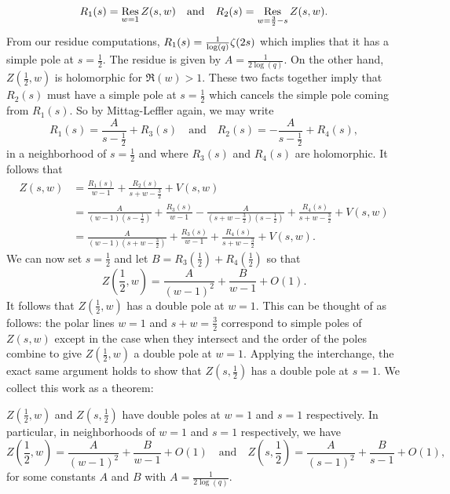 \documentclass[12pt,reqno,oneside]{amsart}
\begin{document}
    \[
        R_{1}(s) = \operatorname*{\mathrm{Res}}_{w = 1}Z(s,w) \quad \text{and} \quad R_{2}(s) = \operatorname*{\mathrm{Res}}_{w = \frac{3}{2}-s}Z(s,w).
    \]
    From our residue computations, $R_{1}(s) = \frac{1}{\log(q)}\zeta(2s)$ which implies that it has a simple pole at $s = \frac{1}{2}$. The residue is given by $A = \frac{1}{2\log(q)}$. On the other hand, $Z\left(\frac{1}{2},w\right)$ is holomorphic for $\Re(w) > 1$. These two facts together imply that $R_{2}(s)$ must have a simple pole at $s = \frac{1}{2}$ which cancels the simple pole coming from $R_{1}(s)$. So by Mittag-Leffler again, we may write
    \[
        R_{1}(s) = \frac{A}{s-\frac{1}{2}}+R_{3}(s) \quad \text{and} \quad R_{2}(s) = -\frac{A}{s-\frac{1}{2}}+R_{4}(s),
    \]
    in a neighborhood of $s = \frac{1}{2}$ and where $R_{3}(s)$ and $R_{4}(s)$ are holomorphic. It follows that
    \begin{align*}
        Z(s,w) &= \frac{R_{1}(s)}{w-1}+\frac{R_{2}(s)}{s+w-\frac{3}{2}}+V(s,w) \\ 
        &= \frac{A}{(w-1)\left(s-\frac{1}{2}\right)}+\frac{R_{3}(s)}{w-1}-\frac{A}{\left(s+w-\frac{3}{2}\right)\left(s-\frac{1}{2}\right)}+\frac{R_{4}(s)}{s+w-\frac{3}{2}}+V(s,w) \\
        &= \frac{A}{(w-1)\left(s+w-\frac{3}{2}\right)}+\frac{R_{3}(s)}{w-1}+\frac{R_{4}(s)}{s+w-\frac{3}{2}}+V(s,w).
    \end{align*}
    We can now set $s = \frac{1}{2}$ and let $B = R_{3}\left(\frac{1}{2}\right)+R_{4}\left(\frac{1}{2}\right)$ so that
    \[
        Z\left(\frac{1}{2},w\right) = \frac{A}{(w-1)^{2}}+\frac{B}{w-1}+O(1).
    \]
    It follows that $Z\left(\frac{1}{2},w\right)$ has a double pole at $w = 1$. This can be thought of as follows: the polar lines $w = 1$ and $s+w = \frac{3}{2}$ correspond to simple poles of $Z(s,w)$ except in the case when they intersect and the order of the poles combine to give $Z\left(\frac{1}{2},w\right)$ a double pole at $w = 1$. Applying the interchange, the exact same argument holds to show that $Z\left(s,\frac{1}{2}\right)$ has a double pole at $s = 1$. We collect this work as a theorem:

    \begin{theorem}\label{thm:double_poles_at_1/2}
        $Z\left(\frac{1}{2},w\right)$ and $Z\left(s,\frac{1}{2}\right)$ have double poles at $w = 1$ and $s = 1$ respectively. In particular, in neighborhoods of $w = 1$ and $s = 1$ respectively, we have
        \[
            Z\left(\frac{1}{2},w\right) = \frac{A}{(w-1)^{2}}+\frac{B}{w-1}+O(1) \quad \text{and} \quad Z\left(s,\frac{1}{2}\right) = \frac{A}{(s-1)^{2}}+\frac{B}{s-1}+O(1),
        \]
        for some constants $A$ and $B$ with $A = \frac{1}{2\log(q)}$. 
    \end{theorem}
\end{document}
